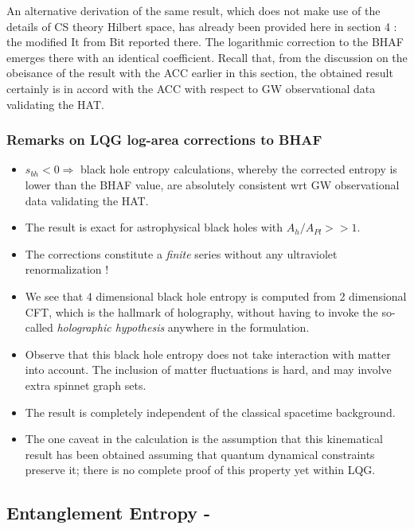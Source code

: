 \documentclass[11pt]{article}
\begin{document}
{An alternative derivation of the same result, which does not make use of the details of CS theory Hilbert space, has already been provided here in section 4 : the modified It from Bit reported there. The logarithmic correction to the BHAF emerges there with an identical coefficient. Recall that, from the discussion on the obeisance of the result with the ACC earlier in this section, the obtained result certainly is in accord with the ACC with respect to GW observational data validating the HAT.

\subsubsection {Remarks on LQG log-area corrections to BHAF}
\begin{itemize}
\item $s_{bh} < 0 \Rightarrow $ black hole entropy calculations, whereby the corrected entropy is lower than the BHAF value, are absolutely consistent wrt GW observational data validating the HAT.
\item The result is exact for astrophysical black holes with $A_h/A_{Pl} >> 1$.
\item The corrections constitute a {\it finite} series without any ultraviolet renormalization ! 
\item We see that 4 dimensional black hole  entropy is computed from 2 dimensional CFT, which is the hallmark of holography, without having to invoke the so-called {\it holographic hypothesis} anywhere in the formulation.
\item Observe that this black hole entropy does not take interaction with matter into account. The inclusion of matter fluctuations is  hard, and may involve extra spinnet graph sets. 
\item The result is completely independent of the classical spacetime background. 
\item The one caveat in the calculation is the assumption that this kinematical result has been obtained assuming that quantum dynamical constraints preserve it; there is no complete proof of this property yet within LQG.  
\end{itemize}

\subsection{Entanglement Entropy \cite{cal1994}-\cite{cd1978}}

}
\end{document}
